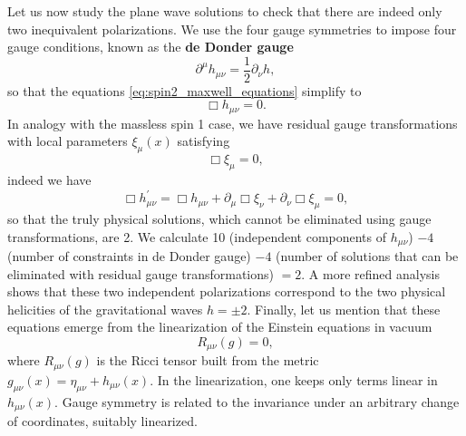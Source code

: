 Let us now study the plane wave solutions to check that there are indeed only two inequivalent polarizations. We use the four gauge symmetries to impose four gauge conditions, known as the \textbf{de Donder gauge}
\begin{equation}
    \partial^{\mu} h_{\mu \nu} = \frac{1}{2} \partial_\nu h,
    \label{eq:de_donder_gauge}
\end{equation}
so that the equations \eqref{eq:spin2_maxwell_equations} simplify to
\[
    \Box h_{\mu \nu} = 0.
\]
In analogy with the massless spin 1 case, we have residual gauge transformations with local parameters \(\xi_\mu(x)\) satisfying
\[
    \Box \xi_\mu = 0,
\]
indeed we have
\[
    \Box h^{\prime}_{\mu \nu} = \Box h_{\mu \nu} + \partial_\mu \Box \xi_\nu + \partial_\nu \Box \xi_\mu = 0,
\]
so that the truly physical solutions, which cannot be eliminated using gauge transformations, are 2. We calculate 10 (independent components of \(h_{\mu \nu}\)) \(-4\) (number of constraints in de Donder gauge) \(-4\) (number of solutions that can be eliminated with residual gauge transformations) \(=2\). A more refined analysis shows that these two independent polarizations correspond to the two physical helicities of the gravitational waves \(h=\pm 2\). Finally, let us mention that these equations emerge from the linearization of the Einstein equations in vacuum
\[
    R_{\mu \nu}(g) = 0,
\]
where \(R_{\mu \nu}(g)\) is the Ricci tensor built from the metric \(g_{\mu \nu}(x)= \eta_{\mu \nu} + h_{\mu \nu}(x)\). In the linearization, one keeps only terms linear in \(h_{\mu \nu}(x)\). Gauge symmetry is related to the invariance under an arbitrary change of coordinates, suitably linearized.